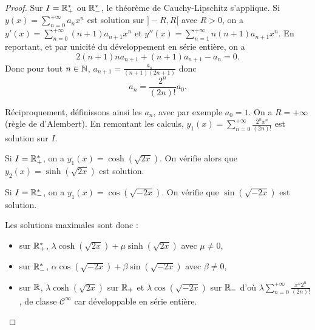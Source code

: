 \documentclass[12pt]{article}
\begin{document}
\begin{proof}
	Sur $I=\mathbb{R}_{+}^{*}$ ou $\mathbb{R}_{-}^{*}$, le théorème de Cauchy-Lipschitz s'applique. Si $y(x)=\sum_{n=0}^{+\infty}a_n x^{n}$ est solution sur $]-R,R[$ avec $R>0$, on a $y'(x)=\sum_{n=0}^{+\infty}(n+1)a_{n+1}x^{n}$ et $y''(x)=\sum_{n=1}^{+\infty}n(n+1)a_{n+1}x^{n}$. En reportant, et par unicité du développement en série entière, on a 
	\begin{equation*}
		2(n+1)n a_{n+1}+(n+1)a_{n+1}-a_n=0.
	\end{equation*}
	Donc pour tout $n\in\mathbb{N}$, $a_{n+1}=\frac{a_n}{(n+1)(2n+1)}$ donc 
	\begin{equation*}
		a_n=\frac{2^{n}}{(2n)!}a_0.
	\end{equation*}

	Réciproquement, définissons ainsi les $a_n$, avec par exemple $a_0=1$. On a $R=+\infty$ (règle de d'Alembert). En remontant les calculs, $y_1(x)=\sum_{n=0}^{+\infty}\frac{2^{n}x^{n}}{(2n)!}$ est solution sur $I$.

	Si $I=\mathbb{R}_{+}^{*}$, on a $y_1(x)=\cosh(\sqrt{2x})$. On vérifie alors que $y_2(x)=\sinh(\sqrt{2x})$ est solution.

	Si $I=\mathbb{R}_{-}^{*}$, on a $y_1(x)=\cos(\sqrt{-2x})$. On vérifie que $\sin(\sqrt{-2x})$ est solution.

	Les solutions maximales sont donc :
	\begin{itemize}
		\item sur $\mathbb{R}_{+}^{*}$, $\lambda\cosh(\sqrt{2x})+\mu\sinh(\sqrt{2x})$ avec $\mu\neq0$,
		\item sur $\mathbb{R}_{-}^{*}$, $\alpha\cos(\sqrt{-2x})+\beta\sin(\sqrt{-2x})$ avec $\beta\neq0$,
		\item sur $\mathbb{R}$, $\lambda\cosh(\sqrt{2x})$ sur $\mathbb{R}_{+}$ et $\lambda\cos(\sqrt{-2x})$ sur $\mathbb{R}_{-}$ d'où $\lambda\sum_{n=0}^{+\infty}\frac{x^{n}2^{n}}{(2n)!}$, de classe $\mathcal{C}^{\infty}$ car développable en série entière.
	\end{itemize}
\end{proof}
\end{document}
